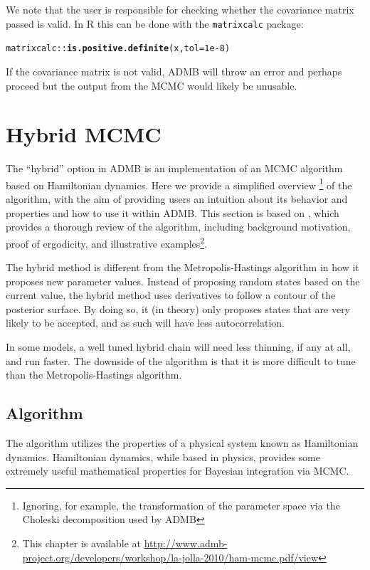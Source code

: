\documentclass{article}\usepackage[]{graphicx}\usepackage[]{color}
\makeatletter
\newcommand{\hlnum}[1]{\textcolor[rgb]{0.686,0.059,0.569}{#1}}%
\newcommand{\hlstd}[1]{\textcolor[rgb]{0.345,0.345,0.345}{#1}}%
\newcommand{\hlkwc}[1]{\textcolor[rgb]{0.333,0.667,0.333}{#1}}%
\newcommand{\hlkwd}[1]{\textcolor[rgb]{0.737,0.353,0.396}{\textbf{#1}}}%
\newenvironment{kframe}{%
 \def\at@end@of@kframe{}%
 \ifinner\ifhmode%
  \def\at@end@of@kframe{\end{minipage}}%
  \begin{minipage}{\columnwidth}%
 \fi\fi%
 \def\FrameCommand##1{\hskip\@totalleftmargin \hskip-\fboxsep
 \colorbox{shadecolor}{##1}\hskip-\fboxsep
     \hskip-\linewidth \hskip-\@totalleftmargin \hskip\columnwidth}%
 \MakeFramed {\advance\hsize-\width
   \@totalleftmargin\z@ \linewidth\hsize
   \@setminipage}}%
 {\par\unskip\endMakeFramed%
 \at@end@of@kframe}
\newenvironment{knitrout}{}{} %
\makeatother
\begin{document}
We note that the user is responsible for checking whether
the covariance matrix passed is valid. In R this can be done
with the \texttt{matrixcalc} package:
\begin{knitrout}
\color{fgcolor}\begin{kframe}
\begin{alltt}
\hlstd{matrixcalc::}\hlkwd{is.positive.definite}\hlstd{(x,} \hlkwc{tol}\hlstd{=}\hlnum{1e-8}\hlstd{)}
\end{alltt}


{\ttfamily\noindent\bfseries\color{errorcolor}{\#\# Error: object 'x' not found}}\end{kframe}
\end{knitrout}
If the covariance matrix is not valid, ADMB will throw an error and
perhaps proceed but the output from the MCMC would likely be unusable.
\section{Hybrid MCMC}\label{sec:hybrid}
The ``hybrid'' option in ADMB is an implementation of an MCMC algorithm
based on Hamiltonian dynamics. Here we provide a simplified overview
\footnote{Ignoring, for example, the transformation of the parameter space
  via the Choleski decomposition used by ADMB} of the algorithm, with the
aim of providing users an intuition about its behavior and properties and
how to use it within ADMB. This section is based on \cite{brooks2011},
which provides a thorough review of the algorithm, including background
motivation, proof of ergodicity, and illustrative examples\footnote{This
  chapter is available at
  \url{http://www.admb-project.org/developers/workshop/la-jolla-2010/ham-mcmc.pdf/view}}.

The hybrid method is different from the Metropolis-Hastings algorithm in how
it proposes new parameter values. Instead of proposing
random states based on the current value, the hybrid method
uses derivatives to follow a contour of the posterior
surface. By doing so, it (in theory) only proposes states
that are very likely to be accepted, and as such will have
less autocorrelation.

In some models, a well tuned hybrid chain will need less
thinning, if any at all, and run faster. The downside of the
algorithm is that it is more difficult to tune than the Metropolis-Hastings
algorithm.

\subsection{Algorithm}
The algorithm utilizes the properties of a physical system
known as Hamiltonian dynamics. Hamiltonian dynamics, while
based in physics, provides some extremely useful
mathematical properties for Bayesian integration via MCMC.
\end{document}
